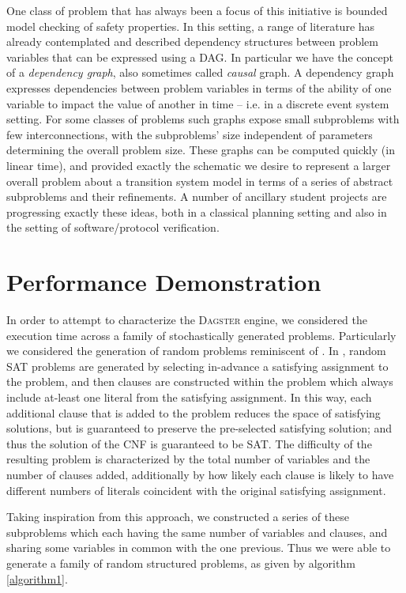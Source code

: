 \documentclass[
10pt, %
a4paper, %
oneside, %
headinclude,footinclude, %
BCOR5mm, %
]{scrartcl}
\begin{document}
One class of problem that has always been a focus of this initiative is bounded model checking of safety properties. 
In this setting, a range of literature has already contemplated and described dependency structures between problem variables that can be expressed using a DAG.
In particular we have the concept of a {\em dependency graph}, also sometimes called {\em causal} graph\cite{Knoblock94,WilliamsN97}.
A dependency graph expresses dependencies between problem variables in terms of the ability of one variable to impact the value of another in time -- i.e. in a discrete event system setting.
For some classes of problems such graphs expose small subproblems with few interconnections, with the subproblems’ size independent of parameters determining the overall problem size.
These graphs can be computed quickly (in linear time), and provided exactly the schematic we desire to represent a larger overall problem about a transition system model in terms of a series of abstract subproblems and their refinements.  
A number of ancillary student projects are progressing exactly these ideas, both in a classical planning setting and also in the setting of software/protocol verification. 


\section{Performance Demonstration}

In order to attempt to characterize the \textsc{Dagster} engine, we considered the execution time across a family of stochastically generated problems.
Particularly we considered the generation of random problems reminiscent of \cite{DBLP:journals/jair/JiaMS07}.
In \cite{DBLP:journals/jair/JiaMS07}, random SAT problems are generated by selecting in-advance a satisfying assignment to the problem, and then clauses are constructed within the problem which
always include at-least one literal from the satisfying assignment.
In this way, each additional clause that is added to the problem reduces the space of satisfying solutions, but is guaranteed to preserve the pre-selected satisfying solution; and 
thus the solution of the CNF is guaranteed to be SAT.
The difficulty of the resulting problem is characterized by the total number of variables and the number of clauses added, additionally by how likely each clause is likely to 
have different numbers of literals coincident with the original satisfying assignment.

Taking inspiration from this approach, we constructed a series of these subproblems which each having the same number of variables and clauses, and sharing some variables in common with the one previous.
Thus we were able to generate a family of random structured problems, as given by algorithm \ref{algorithm1}.
\end{document}
